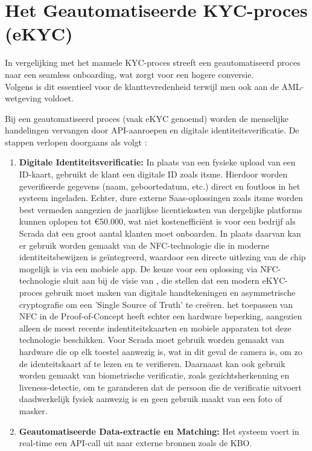 \section{Het Geautomatiseerde KYC-proces (eKYC)}
In vergelijking met het manuele KYC-proces streeft een geautomatiseerd proces naar een seamless onboarding, wat zorgt voor een hogere conversie. \\ Volgens \autocite{Deloitte2024} is dit essentieel voor de klanttevredenheid
terwijl men ook aan de AML-wetgeving voldoet. 

Bij een geautomatiseerd proces (vaak eKYC genoemd) worden de menselijke handelingen vervangen door API-aanroepen en digitale identiteitsverificatie. 
De stappen verlopen doorgaans als volgt \autocite{ItsmeKYC2024, Deloitte2024}:

\begin{enumerate}
    \item \textbf{Digitale Identiteitsverificatie:} In plaats van een fysieke upload van een ID-kaart, gebruikt de klant een digitale ID zoals itsme. 
    Hierdoor worden geverifieerde gegevens (naam, geboortedatum, etc.) direct en foutloos in het systeem ingeladen. Echter, dure externe Saas-oplossingen zoals itsme worden best vermeden 
    aangezien de jaarlijkse licentiekosten van dergelijke platforms kunnen oplopen tot €50.000, wat niet kostenefficiënt is voor een bedrijf als Scrada dat een groot aantal klanten moet onboarden. 
    In plaats daarvan kan er gebruik worden gemaakt van de NFC-technologie die in moderne identiteitsbewijzen is geïntegreerd, waardoor een directe uitlezing van de chip mogelijk is via een mobiele app.
    De keuze voor een oplossing via NFC-technologie sluit aan bij de visie van \autocite{Kumar2020}, die stellen dat een modern eKYC-proces gebruik moet maken van digitale handtekeningen en asymmetrische cryptografie om een 'Single Source of Truth' te creëren.
    het toepassen van NFC in de Proof-of-Concept heeft echter een hardware beperking, aangezien alleen de meest recente indentiteitskaarten en mobiele apparaten tot deze technologie beschikken. Voor Scrada moet gebruik worden gemaakt van hardware
    die op elk toestel aanwezig is, wat in dit geval de camera is, om zo de identeitskaart af te lezen en te verifieren. Daarnaast kan ook gebruik worden gemaakt van biometrische verificatie, zoals gezichtsherkenning en liveness-detectie, om te garanderen dat de persoon die de verificatie uitvoert daadwerkelijk fysiek aanwezig is en geen gebruik maakt van een foto of masker.
    \item \textbf{Geautomatiseerde Data-extractie en Matching:} Het systeem voert in real-time een API-call uit naar externe bronnen zoals de KBO. 

\end{enumerate}
